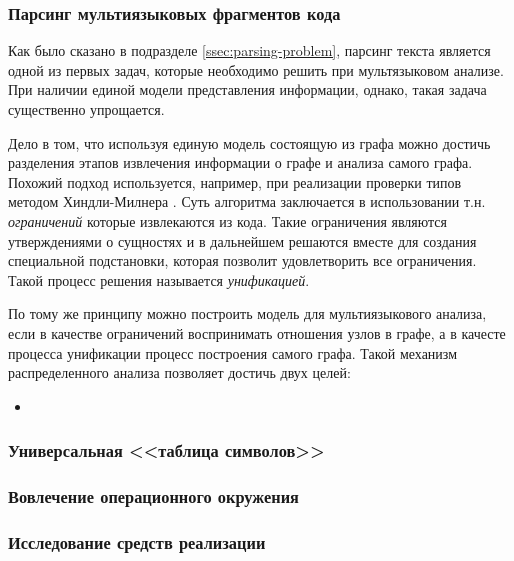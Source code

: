 


\subsubsection{Парсинг мультиязыковых фрагментов кода}

Как было сказано в подразделе \ref{ssec:parsing-problem}, парсинг текста является одной из первых
задач, которые необходимо решить при мультязыковом анализе. При наличии единой модели представления информации,
однако, такая задача существенно упрощается.

Дело в том, что используя единую модель состоящую из графа можно достичь разделения этапов
извлечения информации о графе и анализа самого графа. Похожий подход используется, например, при
реализации проверки типов методом Хиндли-Милнера \cite{algorithm-W}. Суть алгоритма заключается
в использовании т.н. \textit{ограничений} которые извлекаются из кода. Такие ограничения являются
утверждениями о сущностях и в дальнейшем решаются вместе для создания специальной подстановки, которая
позволит удовлетворить все ограничения. Такой процесс решения называется \textit{унификацией}.

По тому же принципу можно построить модель для мультиязыкового анализа, если в качестве ограничений
воспринимать отношения узлов в графе, а в качесте процесса унификации процесс построения самого графа. Такой
механизм распределенного анализа позволяет достичь двух целей:
\begin{itemize}
    \item 
\end{itemize}


\subsubsection{Универсальная <<таблица символов>>}


\subsubsection{Вовлечение операционного окружения}


\subsubsection{Исследование средств реализации}



\clearpage